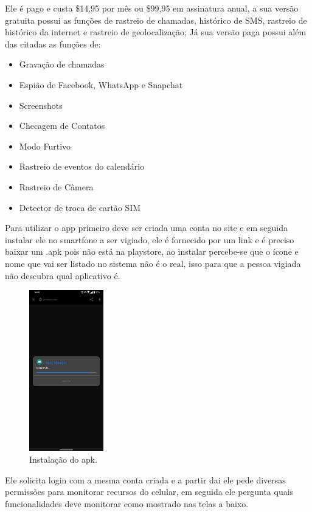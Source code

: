 \documentclass[12pt]{article}
\begin{document}
Ele é pago e custa \$14,95 por mês ou \$99,95 em assinatura anual, a sua versão gratuita possui as funções de rastreio de chamadas, histórico de SMS, rastreio de histórico da internet e rastreio de geolocalização; Já sua versão paga possui além das citadas as funções de:
\begin{itemize}
\item Gravação de chamadas
\item Espião de Facebook, WhatsApp e Snapchat
\item Screenshots
\item Checagem de Contatos
\item Modo Furtivo
\item Rastreio de eventos do calendário
\item Rastreio de Câmera
\item Detector de troca de cartão SIM
\end{itemize}

Para utilizar o app primeiro deve ser criada uma conta no site e em seguida instalar ele no smartfone a ser vigiado, ele é fornecido por um link e é preciso baixar um .apk pois não está na playstore, ao instalar percebe-se que o ícone e nome que vai ser listado no sistema não é o real, isso para que a pessoa vigiada não descubra qual aplicativo é.
\newpage
\begin{figure}[H]
    \centering
    \includegraphics[height=7cm]{instalação.jpeg}
    \caption{Instalação do apk.}
\end{figure}

Ele solicita login com a mesma conta criada e a partir dai ele pede diversas permissões para monitorar recursos do celular, em seguida ele pergunta quais funcionalidades deve monitorar como mostrado nas telas a baixo.
\end{document}
